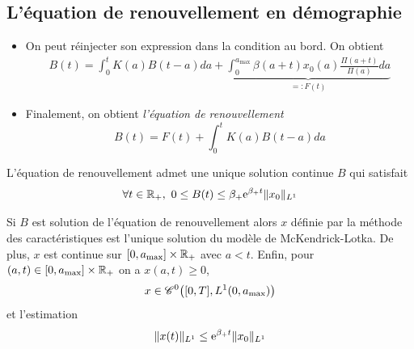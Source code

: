 \subsection{L'équation de renouvellement en démographie}
\begin{frame}
    \begin{itemize}
        \item On peut réinjecter son expression dans la condition au bord. On obtient
        \begin{eqnarray*}
            B(t) = \int_0^t K(a)B(t-a)d a + \underbrace{\int_0^{a_{\max}} \beta(a+t)x_0(a)\frac{\Pi(a+t)}{\Pi(a)}d a}_{=:F(t)}
        \end{eqnarray*} \pause
        \item Finalement, on obtient \textcolor{astral}{\textit{l'équation de renouvellement}}
        \begin{equation*}
            B(t) = F(t)+\int_0^tK(a)B(t-a)d a
        \end{equation*}
    \end{itemize}
\end{frame}

\begin{frame}
    \begin{theoreme}
        L'équation de renouvellement admet une unique solution continue $B$ qui satisfait 
        \begin{equation*}
            \forall t \in \mathbb{R}_+, \ 0 \leq B(t) \leq \beta_+\mathrm{e}^{\beta_+ t}\|x_0\|_{L^1}
        \end{equation*}
    \end{theoreme}
    \pause
    \begin{theoreme}
        Si $B$ est solution de l'équation de renouvellement alors $x$ définie par la méthode des caractéristiques est l'unique solution du modèle de McKendrick-Lotka. De plus, $x$ est continue sur $[0,a_{\max}] \times \mathbb{R}_+$ avec $a<t$. Enfin, pour $(a,t) \in [0,a_{\max}] \times \mathbb{R}_+$ on a $x(a,t) \geq 0$,
        \begin{equation*}
            x \in \mathscr{C}^0\big([0,T], L^1(0,a_{\max})\big)
        \end{equation*}
        et l'estimation
        \begin{equation*}
            \|x(t)\|_{L^1} \leq \mathrm{e}^{\beta_+t}\|x_0\|_{L^1}
        \end{equation*}
    \end{theoreme}
\end{frame}

